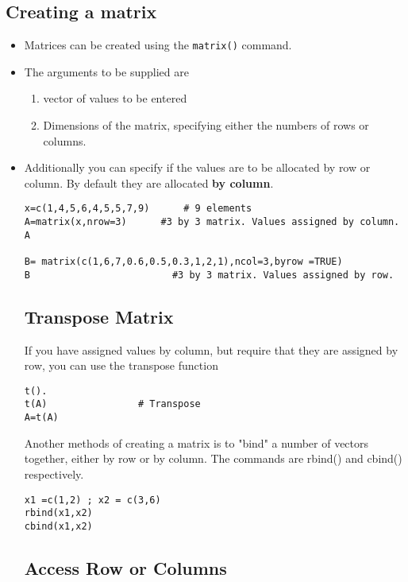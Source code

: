 \documentclass[a4paper,12pt]{article}
\begin{document}
\subsection{Creating a matrix}
\begin{itemize}
\item Matrices can be created using the \texttt{matrix()} command. 
\item The arguments to be supplied are 
\begin{enumerate}
\item vector of values to be entered
\item Dimensions of the matrix, specifying either the numbers of rows or columns.
\end{enumerate}
\item 
Additionally you can specify if the values are to be allocated by row or column. By default they are allocated \textbf{by column}.
\begin{verbatim}
x=c(1,4,5,6,4,5,5,7,9)		# 9 elements
A=matrix(x,nrow=3)		#3 by 3 matrix. Values assigned by column.
A

B= matrix(c(1,6,7,0.6,0.5,0.3,1,2,1),ncol=3,byrow =TRUE)
B				          #3 by 3 matrix. Values assigned by row.
\end{verbatim}	

\subsection*{Transpose Matrix}
If you have assigned values by column, but require that they are assigned by row, you can use the transpose function
\begin{framed}
\begin{verbatim}
t().
t(A)				# Transpose
A=t(A)	
\end{verbatim}
\end{framed}
Another methods of creating a matrix is to "bind" a number of vectors together, either by row or by column. The commands are rbind() and cbind() respectively.
\begin{verbatim}
x1 =c(1,2) ; x2 = c(3,6)
rbind(x1,x2)
cbind(x1,x2)
\end{verbatim}

\newpage
\subsection*{Access Row or Columns}


\end{itemize}
\end{document}
